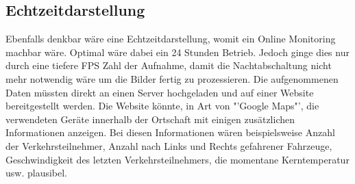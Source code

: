 \subsection{Echtzeitdarstellung}
Ebenfalls denkbar wäre eine Echtzeitdarstellung, womit ein Online Monitoring machbar wäre. Optimal wäre dabei ein 24 Stunden Betrieb. Jedoch ginge dies nur durch eine tiefere FPS Zahl der Aufnahme, damit die Nachtabschaltung nicht mehr notwendig wäre um die Bilder fertig zu prozessieren. Die aufgenommenen Daten müssten direkt an einen Server hochgeladen und auf einer Website bereitgestellt werden. Die Website könnte, in Art von "'Google Maps"', die verwendeten Geräte innerhalb der Ortschaft mit einigen zusätzlichen Informationen anzeigen. Bei diesen Informationen wären beispielsweise Anzahl der Verkehrsteilnehmer, Anzahl nach Links und Rechts gefahrener Fahrzeuge, Geschwindigkeit des letzten Verkehrsteilnehmers, die momentane Kerntemperatur usw. plausibel.